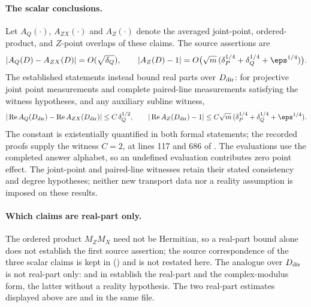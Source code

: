 \documentclass[11pt]{article}
\begin{document}
\paragraph{The scalar conclusions.}
Let $A_Q(\cdot)$, $A_{ZX}(\cdot)$ and $A_Z(\cdot)$ denote the averaged
joint-point, ordered-product, and $Z$-point overlaps of these claims.  The
source assertions are
\[
 |A_Q(D)-A_{ZX}(D)|=O(\sqrt{\delta_Q}),\qquad
 |A_Z(D)-1|=O\bigl(\sqrt m\,
   (\delta_P^{1/4}+\delta_Q^{1/4}+\eps^{1/4})\bigr).
\]
The established statements instead bound real parts over $D_{\rm dir}$: for
projective joint point measurements and complete paired-line measurements
satisfying the witness hypotheses, and any auxiliary subline witness,
\[
 |\operatorname{Re}A_Q(D_{\rm dir})-
     \operatorname{Re}A_{ZX}(D_{\rm dir})|\le C\,\delta_Q^{1/2},\qquad
 |\operatorname{Re}A_Z(D_{\rm dir})-1|\le
 C\sqrt m\,(\delta_P^{1/4}+\delta_Q^{1/4}+\eps^{1/4}).
\]
The constant is existentially quantified in both formal statements; the
recorded proofs supply the witness $C=2$, at lines 117 and 686 of
.  The evaluations use the
completed answer alphabet, so an undefined evaluation contributes zero point
effect.  The joint-point and paired-line witnesses retain their stated
consistency and degree hypotheses; neither new transport data nor a reality
assumption is imposed on these results.

\paragraph{Which claims are real-part only.}
The ordered product $M_ZM_X$ need not be Hermitian, so a real-part bound
alone does not establish the first source assertion; the source
correspondence of the three scalar claims is kept in
() and is not restated here.  The 
analogue over $D_{\rm dir}$ is not real-part only:
 and
 in
 establish the real-part and
the complex-modulus form, the latter without a reality hypothesis.  The two
real-part estimates displayed above are
 and
 in the same file.
\end{document}
